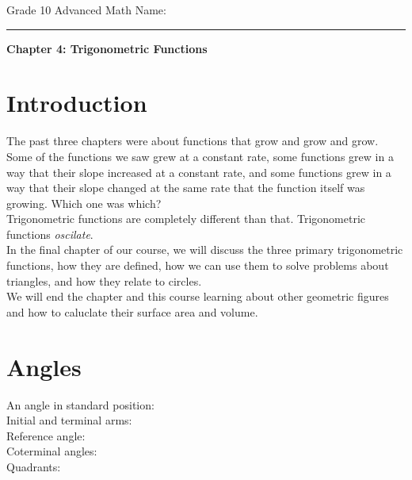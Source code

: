 \documentclass[12pt,fleqn]{book}
\begin{document}
\noindent
\thispagestyle{empty}
Grade 10 Advanced Math \hfill Name: \hspace{2in}
\medskip\hrule
\noindent

\vfill

\begin{center}
	{\bf \huge Chapter 4: Trigonometric Functions}
\end{center}

\vfill
\vfill

\clearpage

\setcounter{page}{1}

\chapter*{Introduction}
The past three chapters were about functions that grow and grow and grow.  Some of the functions we saw grew at a constant rate, some functions grew in a way that their slope increased at a constant rate, and some functions grew in a way that their slope changed at the same rate that the function itself was growing.  Which one was which?
\\[1em]
Trigonometric functions are completely different than that.  Trigonometric functions \emph{oscilate}.
\\[1em]
In the final chapter of our course, we will discuss the three primary trigonometric functions, how they are defined, how we can use them to solve problems about triangles, and how they relate to circles.\\
We will end the chapter and this course learning about other geometric figures and how to caluclate their surface area and volume.
\\
\chapter{Angles}
An angle in standard position:
\\[5em]
Initial and terminal arms:
\\[5em]
Reference angle:
\\[5em]
Coterminal angles:
\\[5em]
Quadrants:
\clearpage
\end{document}
